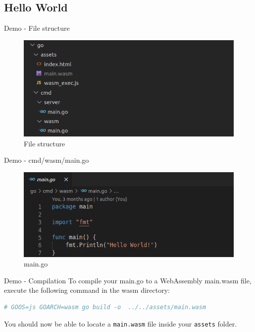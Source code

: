 \documentclass{beamer}
\begin{document}
\subsection{Hello World}

\begin{frame}{Demo - File structure}
    \begin{figure}
        \includegraphics[scale=0.5]{./images/structure.png}
        \caption{File structure}
    \end{figure}
\end{frame}


\begin{frame}{Demo - cmd/wasm/main.go}
    \begin{figure}
        \includegraphics[scale=0.5]{./images/main2.png}
        \caption{main.go}
    \end{figure}
\end{frame}

\begin{frame}[fragile]{Demo - Compilation}
    To compile your main.go to a WebAssembly main.wasm file, execute the following command in the wasm directory:

    \begin{lstlisting}[language=Bash,basicstyle=\scriptsize]
# GOOS=js GOARCH=wasm go build -o  ../../assets/main.wasm
    \end{lstlisting}

    You should now be able to locate a \lstinline{main.wasm} file inside your \lstinline{assets} folder.
\end{frame}
\end{document}
